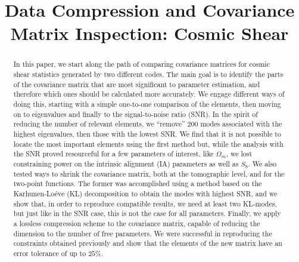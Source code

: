 \documentclass[twocolumn]{\docclass}
\begin{document}
	
	\title{Data Compression and Covariance Matrix Inspection: Cosmic Shear}
	
	\maketitlepre
	
	\begin{abstract}
		
		
		In this paper, we start along the path of comparing covariance matrices for cosmic shear statistics generated by two different codes. The main goal is to identify the parts of the covariance matrix that are most significant to parameter estimation, and therefore which ones should be calculated more accurately. We engage different ways of doing this, starting with a simple one-to-one comparison of the elements, then moving on to eigenvalues and finally to the signal-to-noise ratio (SNR). In the spirit of reducing the number of relevant elements, we “remove” 200 modes associated with the highest eigenvalues, then those with the lowest SNR. We find that it is not possible to locate the most important elements using the first method but, while the analysis with the SNR proved resourceful for a few parameters of interest, like $\Omega_m$, we lost constraining power on the intrinsic alignment (IA) parameters as well as $S_8$. We also tested ways to shrink the covariance matrix, both at the tomographic level, and for the two-point functions. The former was accomplished using a method based on the Karhunen-Lo\'eve (KL) decomposition to obtain the modes with highest SNR, and we show that, in order to reproduce compatible results, we need at least two KL-modes, but just like in the SNR case, this is not the case for all parameters. Finally, we apply a lossless compression scheme to the covariance matrix, capable of reducing the dimension to the number of free parameters. We were successful in reproducing the constraints obtained previously and show that the elements of the new matrix have an error tolerance of up to $25\%$.
		
	\end{abstract}
	
\end{document}
